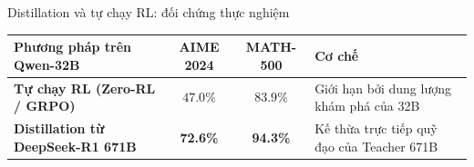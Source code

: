 \begin{frame}{Distillation và tự chạy RL: đối chứng thực nghiệm}
  \vspace{0.06cm}
  \small
  \renewcommand{\arraystretch}{1.20}
  \begin{tabularx}{\textwidth}{@{}>{\raggedright\arraybackslash}X c c >{\raggedright\arraybackslash}X@{}}
    \toprule
    \textbf{Phương pháp trên Qwen-32B} & \textbf{AIME 2024} & \textbf{MATH-500} & \textbf{Cơ chế} \\
    \midrule
    \textbf{Tự chạy RL (Zero-RL / GRPO)} & $47.0\%$ & $83.9\%$ & Giới hạn bởi dung lượng khám phá của 32B \\
    \textbf{Distillation từ DeepSeek-R1 671B} & \textbf{\textcolor{tealgreen}{72.6\%}} & \textbf{\textcolor{tealgreen}{94.3\%}} & Kế thừa trực tiếp quỹ đạo của Teacher 671B \\
    \bottomrule
  \end{tabularx}

  \vspace{0.15cm}
  \par\vspace{0pt}
\end{frame}

